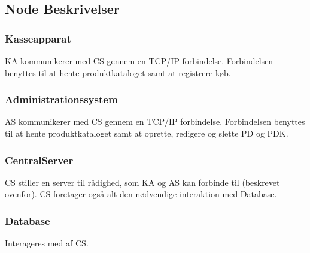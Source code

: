 \subsection{Node Beskrivelser}

\subsubsection{Kasseapparat}
\gls{KA} kommunikerer med \gls{CS} gennem en TCP/IP forbindelse. Forbindelsen benyttes til at hente produktkataloget samt at registrere køb.

\subsubsection{Administrationssystem}
\gls{AS} kommunikerer med \gls{CS} gennem en TCP/IP forbindelse. Forbindelsen benyttes til at hente produktkataloget samt at oprette, redigere og slette \gls{PD} og \gls{PDK}.

\subsubsection{CentralServer}
\gls{CS} stiller en server til rådighed, som \gls{KA} og \gls{AS} kan forbinde til (beskrevet ovenfor). \gls{CS} foretager også alt den nødvendige interaktion med Database.

\subsubsection{Database}
Interageres med af \gls{CS}.